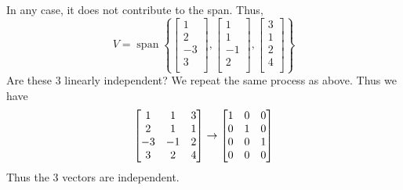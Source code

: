 \documentclass{article}
\DeclareMathOperator{\spn}{span}
\begin{document}
\begin{example}
    In any case, it does not contribute to the span. Thus,
    \[
      V = \spn \left\{
        \begin{bmatrix}
          1\\2\\-3\\3\\
        \end{bmatrix},
        \begin{bmatrix}
          1\\1\\-1\\2\\
        \end{bmatrix},
        \begin{bmatrix}
          3\\1\\2\\4\\
      \end{bmatrix}\right\}
    \]
    Are these 3 linearly independent? We repeat the same process as above. Thus we have \[
      \begin{bmatrix}
        1 & 1 & 3\\
        2 & 1 & 1\\
        -3 & -1 & 2\\
        3 & 2 & 4\\
      \end{bmatrix}
      \to
      \begin{bmatrix}
        \imat{3}\\
        0 & 0 & 0\\
      \end{bmatrix}
    \]
    Thus the 3 vectors are independent.
  \end{example}
\end{document}
